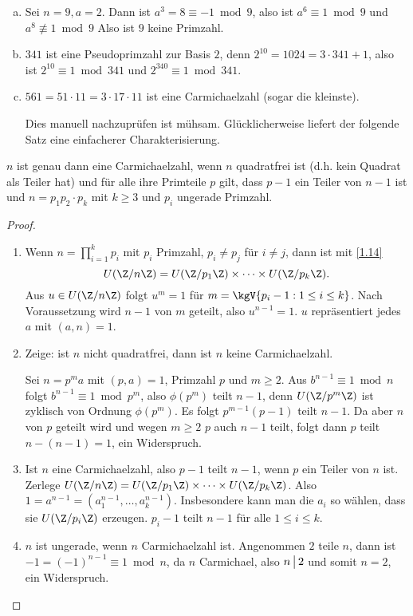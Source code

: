 \begin{ex} \label{3.7}
	\begin{enumerate}[a)]
		\item
			Sei $n=9, a= 2$.
			Dann ist $a^3 = 8 \equiv -1 \bmod 9$, also ist $a^6 \equiv 1 \bmod 9$ und $a^8 \not\equiv 1 \bmod 9$
			Also ist $9$ keine Primzahl.
		\item
			$341$ ist eine Pseudoprimzahl zur Basis $2$, denn $2^10 = 1024 = 3\cdot 341 + 1$, also ist $2^10 \equiv 1 \bmod 341$ und $2^{340} \equiv 1 \bmod 341$.
		\item
			$561 = 51 \cdot 11 = 3 \cdot 17 \cdot 11$ ist eine Carmichaelzahl (sogar die kleinste).

			Dies manuell nachzuprüfen ist mühsam.
			Glücklicherweise liefert der folgende Satz eine einfacherer Charakterisierung.
	\end{enumerate}
\end{ex}

\begin{st}[Korselt, 1899] \label{3.8}
	$n$ ist genau dann eine Carmichaelzahl, wenn $n$ quadratfrei ist (d.h. kein Quadrat als Teiler hat) und für alle ihre Primteile $p$ gilt, dass $p-1$ ein Teiler von $n-1$ ist und $n = p_1 p_2 \cdot p_k$ mit $k \ge 3$ und $p_i$ ungerade Primzahl.
	\begin{proof}
		\begin{enumerate}[1.]
			\item
				Wenn $n = \prod_{i=1}^k p_i$ mit $p_i$ Primzahl, $p_i \neq p_j$ für $i \neq j$, dann ist mit \ref{1.14}
				\[
					U(\Z / n\Z) = U(\Z / p_1\Z) \times \dotsb \times U(\Z / p_k \Z).
				\]
				Aus $u \in U(\Z / n\Z)$ folgt $u^m = 1$ für $m = \kgV \{p_i-1 : 1 \le i \le k\}$.
				Nach Voraussetzung wird $n - 1$ von $m$ geteilt, also $u^{n-1} = 1$.
				$u$ repräsentiert jedes $a$ mit $(a,n) = 1$.
			\item
				Zeige: ist $n$ nicht quadratfrei, dann ist $n$ keine Carmichaelzahl.

				Sei $n = p^m a$ mit $(p,a) = 1$, Primzahl $p$ und $m \ge 2$.
				Aus $b^{n-1} \equiv 1 \bmod n$ folgt $b^{n-1} \equiv 1 \bmod p^m$, also $\phi(p^m)$ teilt $n-1$, denn $U(\Z / p^m \Z)$ ist zyklisch von Ordnung $\phi(p^m)$.
				Es folgt $p^{m-1} (p-1)$ teilt $n-1$.
				Da aber $n$ von $p$ geteilt wird und wegen $m \ge 2$ $p$ auch $n-1$ teilt, folgt dann $p$ teilt $n - (n-1) = 1$, ein Widerspruch.
			\item
				Ist $n$ eine Carmichaelzahl, also $p-1$ teilt $n-1$, wenn $p$ ein Teiler von $n$ ist.
				Zerlege $U(\Z / n\Z) = U(\Z / p_1 \Z) \times \dotsb \times U(\Z / p_k \Z)$.
				Also $1 = a^{n-1} = (a_1^{n-1}, \dotsc, a_k^{n-1})$.
				Insbesondere kann man die $a_i$ so wählen, dass sie $U(\Z/p_i \Z)$ erzeugen.
				$p_i - 1$ teilt $n-1$ für alle $1 \le i \le k$.
			\item
				$n$ ist ungerade, wenn $n$ Carmichaelzahl ist.
				Angenommen $2$ teile $n$, dann ist $-1 = (-1)^{n-1} \equiv 1 \bmod n$, da $n$ Carmichael, also $n \divs 2$ und somit $n = 2$, ein Widerspruch.
		\end{enumerate}
	\end{proof}
\end{st}

